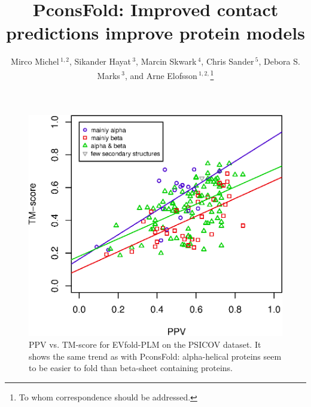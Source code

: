 \documentclass{bioinfo}
\begin{document}

\title[PconsFold]{PconsFold: Improved contact predictions improve
  protein models}
\author[M.Michel \textit{et~al}]{Mirco Michel\,$^{1,2}$, Sikander
  Hayat\,$^{3}$, Marcin Skwark\,$^{4}$, Chris Sander\,$^{5}$, Debora
  S. Marks\,$^{3}$,  and Arne Elofsson\,$^{1,2,}$\footnote{To whom correspondence should be addressed.}}
\address{$^{1}$Department of Biochemistry and Biophysics, Stockholm University, 10691 Stockholm, Sweden,
$^{2}$Science for Life Laboratory, Box 1031, 17121 Solna, Sweden,
$^{3}$Department of Systems Biology, Harvard Medical School, Boston, Massachusetts, USA,
$^{4}$Department of Information and Computer Science, Aalto University, PO Box 15400, FI-00076 Aalto, Finland, and
$^{5}$Computational Biology Center, Memorial Sloan-Kettering Cancer Center, New York, New York, USA}



\maketitle

\begin{figure}[!b]%
\centerline{\includegraphics[scale=0.7]{figures/TMscore_EVfold-pcons_vs_PPV-plmDCA.eps}}
\caption{PPV vs. TM-score for EVfold-PLM on the PSICOV dataset. It
shows the same trend as with PconsFold: alpha-helical proteins seem to
be easier to fold than beta-sheet containing proteins.}\label{fig:ppvtm_evfold}
\end{figure}
\end{document}
